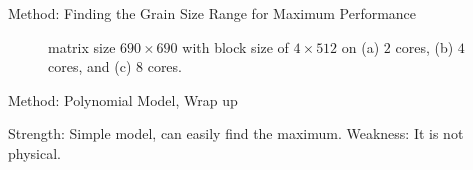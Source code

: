\documentclass[10pt]{beamer}
\begin{document}
\begin{frame}{Method: Finding the Grain Size Range for Maximum Performance}
\begin{outline}
\begin{figure}[H]
			\caption{matrix size $690\times690$ with block size of  $4\times512$ on (a) $2$ cores, (b) $4$ cores, and (c) $8$ cores. }	
			\label{fig14}
		\end{figure}
	\end{outline}
\end{frame}


\begin{frame}{Method: Polynomial Model, Wrap up}
	\begin{outline}
		\0Strength:
		\1Simple model, can easily find the maximum.
		\0Weakness:
		\1It is not physical.
	\end{outline}
\end{frame}



\end{document}
